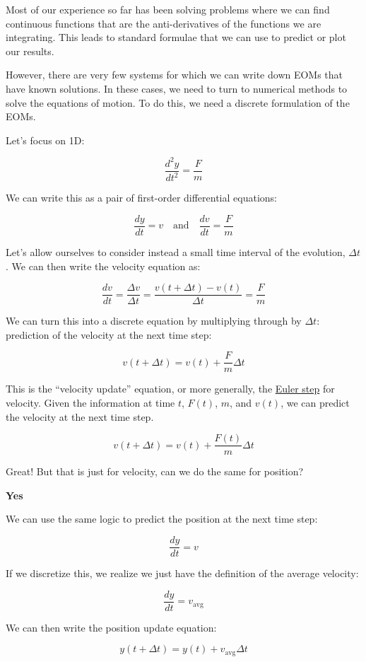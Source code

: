 \documentclass[11pt]{article}
\begin{document}
Most of our experience so far has been solving problems where we can
find continuous functions that are the anti-derivatives of the functions
we are integrating. This leads to standard formulae that we can use to
predict or plot our results.

However, there are very few systems for which we can write down EOMs
that have known solutions. In these cases, we need to turn to numerical
methods to solve the equations of motion. To do this, we need a discrete
formulation of the EOMs.

Let's focus on 1D:

\[\dfrac{d^2y}{dt^2} = \dfrac{F}{m}\]

We can write this as a pair of first-order differential equations:

\[\dfrac{dy}{dt} = v \quad \textrm{and} \quad \dfrac{dv}{dt} = \dfrac{F}{m}\]

Let's allow ourselves to consider instead a small time interval of the
evolution, \(\Delta t\). We can then write the velocity equation as:

\[\dfrac{dv}{dt} = \dfrac{\Delta v}{\Delta t}= \dfrac{v(t+\Delta t) - v(t)}{\Delta t} = \dfrac{F}{m}\]

We can turn this into a discrete equation by multiplying through by
\(\Delta t\): prediction of the velocity at the next time step:

\[v(t+\Delta t) = v(t) + \dfrac{F}{m} \Delta t\]

This is the ``velocity update'' equation, or more generally, the
\href{https://en.wikipedia.org/wiki/Euler_method}{Euler step} for
velocity. Given the information at time \(t\), \(F(t)\), \(m\), and
\(v(t)\), we can predict the velocity at the next time step.

\[v(t+\Delta t) = v(t) + \dfrac{F(t)}{m} \Delta t\]

Great! But that is just for velocity, can we do the same for position?

\textbf{Yes}

We can use the same logic to predict the position at the next time step:

\[\dfrac{dy}{dt} = v\]

If we discretize this, we realize we just have the definition of the
average velocity:

\[\dfrac{dy}{dt} = v_{\textrm{avg}}\]

We can then write the position update equation:

\[y(t+\Delta t) = y(t) + v_{\textrm{avg}} \Delta t\]
\end{document}
